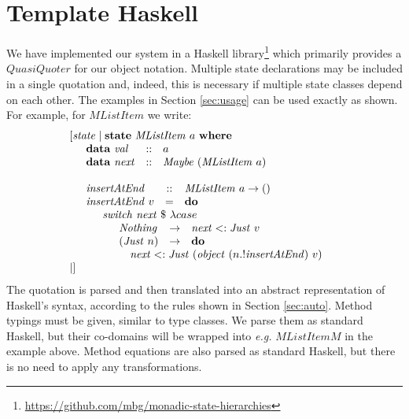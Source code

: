 \section{Template Haskell}
\label{sec:th}

We have implemented our system in a Haskell library\footnote{\url{https://github.com/mbg/monadic-state-hierarchies}} which primarily provides a $\mathit{QuasiQuoter}$ \citep{mainland2007s} for our object notation. Multiple state declarations may be included in a single quotation and, indeed, this is necessary if multiple state classes depend on each other. The examples in Section \ref{sec:usage} can be used exactly as shown. For example, for $\mathit{MListItem}$ we write:
\begin{displaymath}
\begin{array}{l}
[\mathit{state}\mid \mathbf{state}~\mathit{MListItem}~a~\mathbf{where} \\
\quad \begin{array}{lcl}
\mathbf{data}~\mathit{val} & :: & a \\
\mathbf{data}~\mathit{next}  & :: & \mathit{Maybe}~(\mathit{MListItem}~a)
\end{array}\\\\
\quad \begin{array}{lcl}
\mathit{insertAtEnd} & :: & \mathit{MListItem}~a \to ()\\
\mathit{insertAtEnd}~v & = & \mathbf{do} \\
\multicolumn{3}{l}{\quad \begin{array}{l}
\mathit{switch}~\mathit{next}~\$~\lambda case \\
\quad \begin{array}{lcl}
\mathit{Nothing} & \to & \mathit{next} <: \mathit{Just}~v  \\
(\mathit{Just}~n) & \to & \mathbf{do} \\
\multicolumn{3}{l}{\quad \mathit{next} <: \mathit{Just}~(\mathit{object}~(n.!\mathit{insertAtEnd})~v) }
\end{array}
\end{array}}
\end{array}\\\mid]
\end{array}
\end{displaymath}
The quotation is parsed and then translated into an abstract representation of Haskell's syntax, according to the rules shown in Section \ref{sec:auto}. Method typings must be given, similar to type classes. We parse them as standard Haskell, but their co-domains will be wrapped into \emph{e.g.} $\mathit{MListItemM}$ in the example above. Method equations are also parsed as standard Haskell, but there is no need to apply any transformations. 

